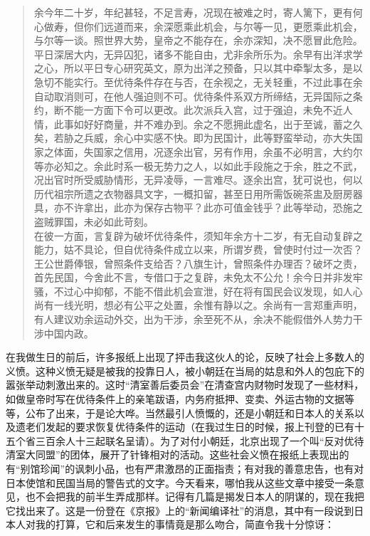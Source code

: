 \begin{quote}
	余今年二十岁，年纪甚轻，不足言寿，况现在被难之时，寄人篱下，更有何心做寿，但你们远道而来，余深愿乘此机会，与尔等一见，更愿乘此机会，与尔等一谈。照世界大势，皇帝之不能存在，余亦深知，决不愿冒此危险。平日深居大内，无异囚犯，诸多不能自由，尤非余所乐为。余早有出洋求学之心，所以平日专心研究英文，原为出洋之预备，只以其中牵掣太多，是以急切不能实行。至优待条件存在与否，在余视之，无关轻重，不过此事在余自动取消则可，在他人强迫则不可。优待条件系双方所缔结，无异国际之条约，断不能一方面下令可以更改。此次派兵入宫，过于强迫，未免不近人情，此事如好好商量，并不难办到。余之不愿拥此虚名，出于至诚，蓄之久矣，若胁之兵威，余心中实感不快。即为民国计，此等野蛮举动，亦大失国家之体面，失国家之信用，况逐余出官，另有作用，余虽不必明言，大约尔等亦必知之。余此时系一极无势力之人，以如此手段施之于余，胜之不武，况出官时所受威胁情形，无异凌辱，一言难尽。逐余出宫，犹可说也，何以历代祖宗所遗之衣物器具文字，一概扣留，甚至日用所需饭碗茶盅及厨房器具，亦不许拿出，此亦为保存古物平？此亦可值金钱乎？此等举动，恐施之盗贼罪国，未必如此苛刻。\\

在彼一方面，言复辟为破坏优待条件，须知年余方十二岁，有无自动复辟之能力，姑不具论，但自优待条件成立以来，所谓岁费，曾使时付过一次否？王公世爵俸银，曾照条件支给否？八旗生计，曾照条件办理否？破坏之责，首先民国，今舍此不言，专借口于之复辟，未免太不公允！余今日并非发牢骚，不过心中抑郁，不能不借此机会宣泄，好在将有国民会议发现，如人心尚有一线光明，想必有公平之处置，余惟有静以之。余尚有一言郑重声明，有人建议劝余运动外交，出为干涉，余至死不从，余决不能假借外人势力干涉中国内政。\\
\end{quote}

在我做生日的前后，许多报纸上出现了抨击我这伙人的论，反映了社会上多数人的义愤。这种义愤无疑是被我的投靠日人，被小朝廷在当局的姑息和外人的包庇下的嚣张举动刺激出来的。这时“清室善后委员会”在清查宫内财物时发现了一些材料，如做皇帝时写在优待条件上的亲笔跋语，内务府抵押、变卖、外运古物的文据等等，公布了出来，于是论大哗。当然最引人愤慨的，还是小朝廷和日本人的关系以及遗老们发起的要求恢复优待条件的运动（在我过生日的时候，报上刊登的已有十五个省三百余人十三起联名呈请）。为了对付小朝廷，北京出现了一个叫“反对优待清室大同盟”的团体，展开了针锋相对的活动。这些社会义愤在报纸上表现出的有“别馆珍闻”的讽刺小品，也有严肃激昂的正面指责；有对我的善意忠告，也有对日本使馆和民国当局的警告式的文字。今天看来，哪怕我从这些文章中接受一条意见，也不会把我的前半生弄成那样。记得有几篇是揭发日本人的阴谋的，现在我把它找出来了。这是一份登在《京报》上的“新闻编译社”的消息，其中有一段说到日本人对我的打算，它和后来发生的事情竟是那么吻合，简直令我十分惊讶：\\

